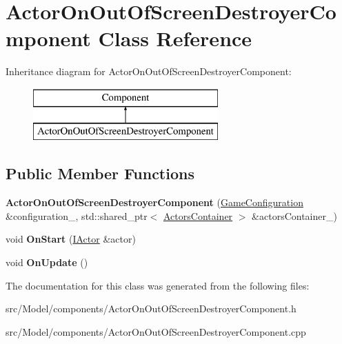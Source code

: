 \hypertarget{classActorOnOutOfScreenDestroyerComponent}{}\section{Actor\+On\+Out\+Of\+Screen\+Destroyer\+Component Class Reference}
\label{classActorOnOutOfScreenDestroyerComponent}
Inheritance diagram for Actor\+On\+Out\+Of\+Screen\+Destroyer\+Component\+:\begin{figure}[H]
\begin{center}
\leavevmode
\includegraphics[height=2.000000cm]{classActorOnOutOfScreenDestroyerComponent}
\end{center}
\end{figure}
\subsection*{Public Member Functions}
\begin{DoxyCompactItemize}
\item 
{\bfseries Actor\+On\+Out\+Of\+Screen\+Destroyer\+Component} (\hyperlink{classGameConfiguration}{Game\+Configuration} \&configuration\+\_\+, std\+::shared\+\_\+ptr$<$ \hyperlink{classActorsContainer}{Actors\+Container} $>$ \&actors\+Container\+\_\+)\hypertarget{classActorOnOutOfScreenDestroyerComponent_a70e6a07f9b53acd79f7bdd95f8445a93}{}\label{classActorOnOutOfScreenDestroyerComponent_a70e6a07f9b53acd79f7bdd95f8445a93}

\item 
void {\bfseries On\+Start} (\hyperlink{classIActor}{I\+Actor} \&actor)\hypertarget{classActorOnOutOfScreenDestroyerComponent_ab2c817cc86953214f066464f89e70c37}{}\label{classActorOnOutOfScreenDestroyerComponent_ab2c817cc86953214f066464f89e70c37}

\item 
void {\bfseries On\+Update} ()\hypertarget{classActorOnOutOfScreenDestroyerComponent_a3dac4185cab4e023f3578444f3010a2c}{}\label{classActorOnOutOfScreenDestroyerComponent_a3dac4185cab4e023f3578444f3010a2c}

\end{DoxyCompactItemize}


The documentation for this class was generated from the following files\+:\begin{DoxyCompactItemize}
\item 
src/\+Model/components/Actor\+On\+Out\+Of\+Screen\+Destroyer\+Component.\+h\item 
src/\+Model/components/Actor\+On\+Out\+Of\+Screen\+Destroyer\+Component.\+cpp\end{DoxyCompactItemize}
